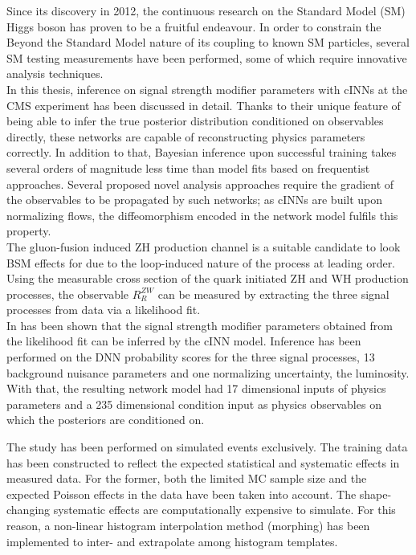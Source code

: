 \label{sec:conclusion}

Since its discovery in 2012, the continuous research on the Standard Model (SM) Higgs boson has proven to be a fruitful endeavour. In order to constrain the Beyond the Standard Model nature of its coupling to known SM particles, several SM testing measurements have been performed, some of which require innovative analysis techniques.\\

In this thesis, inference on signal strength modifier parameters with cINNs at the CMS experiment has been discussed in detail. Thanks to their unique feature of being able to infer the true posterior distribution conditioned on observables directly, these networks are capable of reconstructing physics parameters correctly. In addition to that, Bayesian inference upon successful training takes several orders of magnitude less time than model fits based on frequentist approaches. Several proposed novel analysis approaches require the gradient of the observables to be propagated by such networks; as cINNs are built upon normalizing flows, the diffeomorphism encoded in the network model fulfils this property.\\

The gluon-fusion induced ZH production channel is a suitable candidate to look BSM effects for due to the loop-induced nature of the process at leading order. Using the measurable cross section of the quark initiated ZH and WH production processes, the observable $R^{ZW}_R$ can be measured by extracting the three signal processes from data via a likelihood fit.\\

In has been shown that the signal strength modifier parameters obtained from the likelihood fit can be inferred by the cINN model. Inference has been performed on the DNN probability scores for the three signal processes, 13 background nuisance parameters and one normalizing uncertainty, the luminosity. With that, the resulting network model had 17 dimensional inputs of physics parameters and a 235 dimensional condition input as physics observables on which the posteriors are conditioned on.

The study has been performed on simulated events exclusively. The training data has been constructed to reflect the expected statistical and systematic effects in measured data. For the former, both the limited MC sample size and the expected Poisson effects in the data have been taken into account. The shape-changing systematic effects are computationally expensive to simulate. For this reason, a non-linear histogram interpolation method (morphing) has been implemented to inter- and extrapolate among histogram templates. \\


